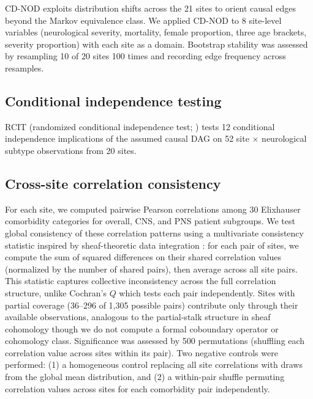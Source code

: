 \documentclass{article}
\begin{document}
CD-NOD \cite{huang2020cdnod} exploits distribution shifts across the 21 sites to orient causal edges beyond the Markov equivalence class.
We applied CD-NOD to 8 site-level variables (neurological severity, mortality, female proportion, three age brackets, severity proportion) with each site as a domain.
Bootstrap stability was assessed by resampling 10 of 20 sites 100 times and recording edge frequency across resamples.

\subsection{Conditional independence testing}

RCIT (randomized conditional independence test; \citealt{strobl2019rcit}) tests 12 conditional independence implications of the assumed causal DAG on 52 site $\times$ neurological subtype observations from 20 sites.

\subsection{Cross-site correlation consistency}

For each site, we computed pairwise Pearson correlations among 30 Elixhauser comorbidity categories for overall, CNS, and PNS patient subgroups.
We test global consistency of these correlation patterns using a multivariate consistency statistic inspired by sheaf-theoretic data integration \cite{robinson2017sheaf}: for each pair of sites, we compute the sum of squared differences on their shared correlation values (normalized by the number of shared pairs), then average across all site pairs.
This statistic captures collective inconsistency across the full correlation structure, unlike Cochran's $Q$ which tests each pair independently.
Sites with partial coverage (36--296 of 1,305 possible pairs) contribute only through their available observations, analogous to the partial-stalk structure in sheaf cohomology though we do not compute a formal coboundary operator or cohomology class.
Significance was assessed by 500 permutations (shuffling each correlation value across sites within its pair).
Two negative controls were performed: (1) a homogeneous control replacing all site correlations with draws from the global mean distribution, and (2) a within-pair shuffle permuting correlation values across sites for each comorbidity pair independently.




\end{document}
